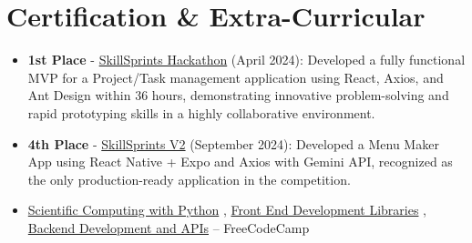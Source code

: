 \documentclass[letterpaper,11pt]{article}
\newcommand{\achievementItem}[1]{
  \item\small{
    {#1 \vspace{-6pt}}
  }
}
\begin{document}
\section{Certification \& Extra-Curricular}
\begin{itemize}[leftmargin=0.2in]
  \achievementItem{\textbf{1st Place} - \href{https://www.linkedin.com/events/skillsprintshackathon-sparkbyst7186758085367980032/}{SkillSprints Hackathon} (April 2024): Developed a fully functional MVP for a Project/Task management application using React, Axios, and Ant Design within 36 hours, demonstrating innovative problem-solving and rapid prototyping skills in a highly collaborative environment.}
  \achievementItem{\textbf{4th Place} - \href{https://www.linkedin.com/events/skillsprintsv2-thehackathond-da7236585518937829377/}{SkillSprints V2} (September 2024): Developed a Menu Maker App using React Native + Expo and Axios with Gemini API, recognized as the only production-ready application in the competition.}
  \achievementItem{\href{https://www.freecodecamp.org/certification/Bhavjit/scientific-computing-with-python-v7}{Scientific Computing with Python} , \href{https://www.freecodecamp.org/certification/Bhavjit/front-end-development-libraries}{Front End Development Libraries} , \href{https://www.freecodecamp.org/certification/Bhavjit/back-end-development-and-apis}{Backend Development and APIs} – FreeCodeCamp}
\end{itemize}

\end{document}
